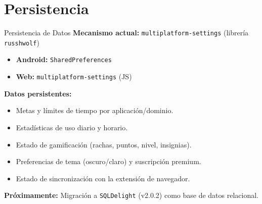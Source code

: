 \documentclass[aspectratio=169]{beamer}
\begin{document}
\section{Persistencia}
\begin{frame}{Persistencia de Datos}
  \textbf{Mecanismo actual:} \texttt{multiplatform-settings} (librería \texttt{russhwolf})

  \vspace{0.3cm}
  \begin{itemize}
    \item \textbf{Android:} \texttt{SharedPreferences}
    \item \textbf{Web:} \texttt{multiplatform-settings} (JS)
  \end{itemize}

  \vspace{0.3cm}
  \textbf{Datos persistentes:}
  \begin{itemize}
    \item[] Metas y límites de tiempo por aplicación/dominio.
    \item[] Estadísticas de uso diario y horario.
    \item[] Estado de gamificación (rachas, puntos, nivel, insignias).
    \item[] Preferencias de tema (oscuro/claro) y suscripción premium.
    \item[] Estado de sincronización con la extensión de navegador.
  \end{itemize}

  \vspace{0.2cm}
  \textbf{Próximamente:} Migración a \texttt{SQLDelight} (v2.0.2) como base de datos relacional.
\end{frame}

\end{document}
